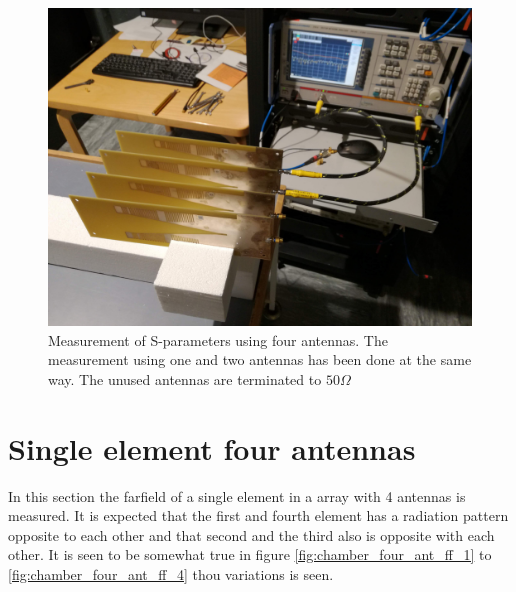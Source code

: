 \begin{figure}[H]
\centering 
\includegraphics[scale = 0.08]{figures/measurement/antennas/spar_meas.jpg}
\caption{Measurement of S-parameters using four antennas. The measurement using one and two antennas has been done at the same way. The unused antennas are terminated to $50\Omega$}
\label{fig:spar_meas}
\end{figure} 


\section{Single element four antennas}
In this section the farfield of a single element in a array with 4 antennas is measured. It is expected that the first and fourth element has a radiation pattern opposite to each other and that second and the third also is opposite with each other. It is seen to be somewhat true in figure \ref{fig:chamber_four_ant_ff_1} to \ref{fig:chamber_four_ant_ff_4} thou variations is seen.     


